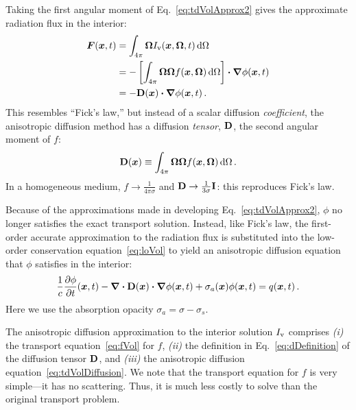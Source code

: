 Taking the first angular moment of Eq.~\eqref{eq:tdVolApprox2} gives the
approximate radiation flux in the interior:
\begin{align} \nonumber
  \bm{F}(\bm{x},t) &= \int_{4\pi} \bm{\Omega} I_\mathrm{v}(\bm{x},\bm{\Omega},t)
  \mathop{}\!\mathrm{d}\Omega
  \\ \nonumber
  &= - \left[ \int_{4\pi} \bm{\Omega} \bm{\Omega} f(\bm{x}, \bm{\Omega}) \mathop{}\!\mathrm{d}\Omega
  \right] \bm{\cdot} \bm{\nabla} \phi(\bm{x},t)
  \\ \label{eq:anisotropicFicks}
  &= - \mathbf{D}(\bm{x}) \bm{\cdot} \bm{\nabla} \phi(\bm{x},t) \,.
\end{align}
This resembles ``Fick's law,'' but instead of a scalar diffusion
\emph{coefficient},
the anisotropic diffusion method has a diffusion \emph{tensor}, $\mathbf{D}$, the
second angular moment of $f$:
\begin{equation}\label{eq:dDefinition}
  \mathbf{D}(\bm{x}) \equiv \int_{4\pi} \bm{\Omega} \bm{\Omega}
  f(\bm{x}, \bm{\Omega}) \mathop{}\!\mathrm{d}\Omega \,.
\end{equation}
In a homogeneous medium, $f\to\frac{1}{4\pi\sigma}$ and
$\mathbf{D}\to\frac{1}{3\sigma}\mathbf{I}$: this reproduces Fick's law.

Because of the approximations made in developing Eq.~\eqref{eq:tdVolApprox2},
$\phi$ no longer satisfies the exact transport solution. Instead, like Fick's
law, the first-order accurate approximation to the radiation flux is substituted
into the low-order conservation equation~\eqref{eq:loVol} to yield an
anisotropic diffusion equation that $\phi$ satisfies in the interior:
\begin{equation} \label{eq:tdVolDiffusion}
\frac{1}{c} \frac{\partial \phi}{\partial t} (\bm{x}, t)
  - \bm{\nabla} \bm{\cdot} \mathbf{D}(\bm{x}) \bm{\cdot} \bm{\nabla} \phi(\bm{x},t)
  + \sigma_a(\bm{x}) \phi(\bm{x}, t)
 = q(\bm{x},t)\,.
\end{equation}
Here we use the absorption opacity $\sigma_a = \sigma - \sigma_s$.

The anisotropic diffusion approximation to the interior solution $I_\mathrm{v}$
comprises \textsl{(i)} the transport equation~\eqref{eq:fVol} for $f$,
\textsl{(ii)} the definition in Eq.~\eqref{eq:dDefinition} of the diffusion
tensor $\mathbf{D}$, and \textsl{(iii)} the anisotropic diffusion
equation~\eqref{eq:tdVolDiffusion}. We note that the transport equation for $f$
is very simple---it has no scattering. Thus, it is much less costly to solve
than the original transport problem.

\clearpage
